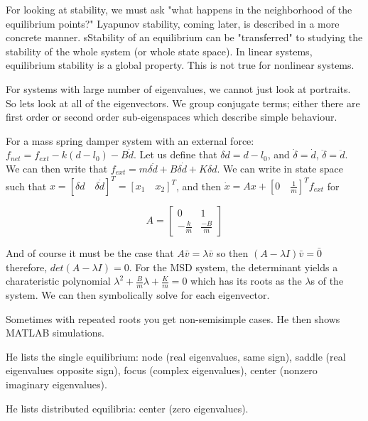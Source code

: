 \documentclass[11pt]{article}
\begin{document}
For looking at stability, we must ask "what happens in the neighborhood of the equilibrium points?" Lyapunov stability, coming later, is described in a more concrete manner. sStability of an equilibrium can be "transferred" to studying the stability of the whole system (or whole state space). In linear systems, equilibrium stability is a global property. This is not true for nonlinear systems.

For systems with large number of eigenvalues, we cannot just look at portraits. So lets look at all of the eigenvectors. We group conjugate terms; either there are first order or second order sub-eigenspaces which describe simple behaviour.

For a mass spring damper system with an external force: $f_{net} =  f_{ext} - k(d-l_0) -B\dot{d}$. Let us define that $\delta d = d-l_0$, and $\dot{\delta}=\dot{d}$, $\ddot{\delta}=\ddot{d}$. We can then write that $f_{ext} = m\delta\ddot{d} + B\delta \dot{d} + K \delta d$. We can write in state space such that $x = [\delta d \quad \delta \dot{d}]^T = [x_1 \quad x_2]^T$, and then $\dot{x} = Ax + [0 \quad \frac{1}{m}]^Tf_{ext}$ for 

\begin{equation}
A=
\begin{bmatrix}
0 &1 \\
-\frac{k}{m} &\frac{-B}{m}
\end{bmatrix}
\end{equation}

And of course it must be the case that $A\bar{v} = \lambda \bar{v}$ so then $(A-\lambda I)\bar{v} = \bar{0}$ therefore, $det(A-\lambda I) = 0$. For the MSD system, the determinant yields a charateristic polynomial $\lambda^2 + \frac{B}{m}\lambda + \frac{K}{m}=0$ which has its roots as the $\lambda$s of the system. We can then symbolically solve for each eigenvector.

Sometimes with repeated roots you get non-semisimple cases. He then shows MATLAB simulations.

He lists the single equilibrium: node (real eigenvalues, same sign), saddle (real eigenvalues opposite sign), focus (complex eigenvalues), center (nonzero imaginary eigenvalues).

He lists distributed equilibria: center (zero eigenvalues).
\end{document}
